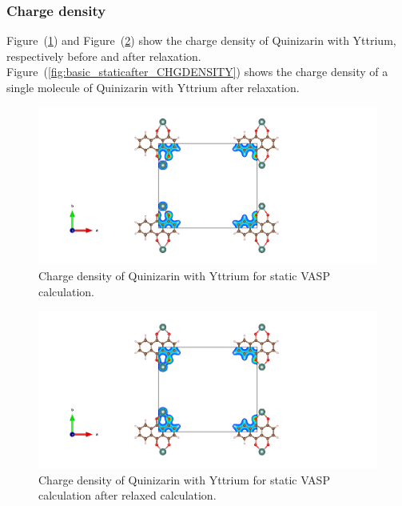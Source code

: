 \documentclass{article}
\begin{document}
      \vspace{1cm}

    \subsubsection{Charge density}

      Figure~(\ref{fig:Y_staticbefore_CHGCAR}) and Figure~(\ref{fig:Y_staticafter_CHGCAR}) show the charge density of Quinizarin with Yttrium, respectively before and after relaxation. Figure~(\ref{fig:basic_staticafter_CHGDENSITY}) shows the charge density of a single molecule of Quinizarin with Yttrium after relaxation. \\

      \begin{figure}[H]
        \centering
        \includegraphics[width = \textwidth]{../fig/Y_staticbefore_CHGCAR.png}
        \caption{Charge density of Quinizarin with Yttrium for static VASP calculation. }
        \label{fig:Y_staticbefore_CHGCAR}
      \end{figure}

      \begin{figure}[H]
        \centering
        \includegraphics[width = \textwidth]{../fig/Y_staticafter_CHGCAR.png}
        \caption{Charge density of Quinizarin with Yttrium for static VASP calculation after relaxed calculation. }
        \label{fig:Y_staticafter_CHGCAR}
      \end{figure}
\end{document}

